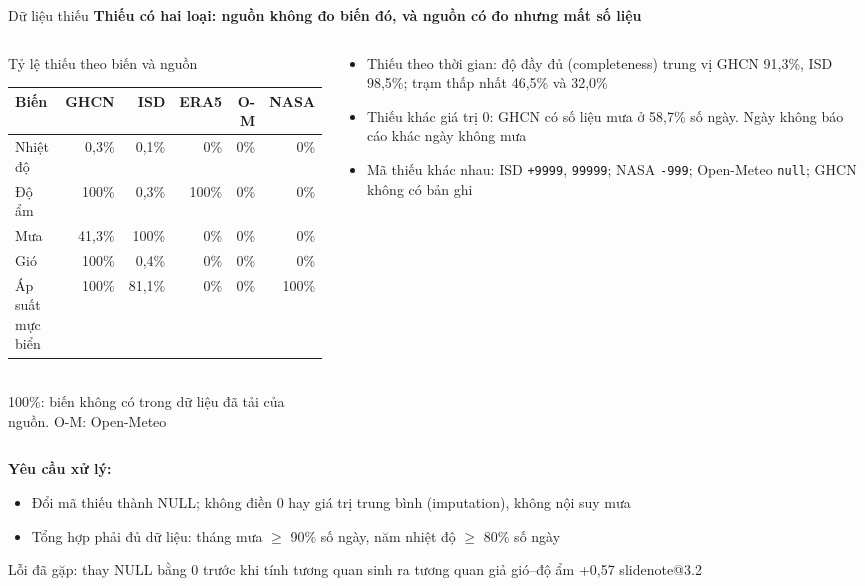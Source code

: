\documentclass[t,aspectratio=169,12pt]{beamer}
\makeatletter
\newcommand{\slidenote}[1]{\ifcsname slidenote@#1\endcsname\note{\csname slidenote@#1\endcsname}\fi}
\newcommand{\ketluan}[1]{\vskip2mm{\color{hustred}#1}}
\newcommand{\ychinh}[1]{\vskip1mm{\bfseries #1}\par\vskip1mm}
\makeatother
\begin{document}
\begin{frame}{Dữ liệu thiếu}
  \ychinh{Thiếu có hai loại: nguồn không đo biến đó, và nguồn có đo nhưng mất số liệu}
  \begin{columns}[T]
    \begin{column}{0.5\textwidth}
      \centering\scriptsize
      Tỷ lệ thiếu theo biến và nguồn\\[1mm]
      \begin{tabular}{@{}lrrrrr@{}}
        \toprule
        Biến & GHCN & ISD & ERA5 & O-M & NASA \\
        \midrule
        Nhiệt độ & 0,3\% & 0,1\% & 0\% & 0\% & 0\% \\
        Độ ẩm & \textcolor{badred}{100\%} & 0,3\% & \textcolor{badred}{100\%} & 0\% & 0\% \\
        Mưa & 41,3\% & \textcolor{badred}{100\%} & 0\% & 0\% & 0\% \\
        Gió & \textcolor{badred}{100\%} & 0,4\% & 0\% & 0\% & 0\% \\
        Áp suất mực biển & \textcolor{badred}{100\%} & 81,1\% & 0\% & 0\% & \textcolor{badred}{100\%} \\
        \bottomrule
      \end{tabular}\\[1mm]
      {\tiny\color{mutedgray}\textcolor{badred}{100\%}: biến không có trong dữ liệu đã tải của nguồn. O-M: Open-Meteo}
    \end{column}
    \begin{column}{0.48\textwidth}
      \begin{itemize}\scriptsize\setlength\itemsep{1mm}
        \item Thiếu theo thời gian: độ đầy đủ (completeness) trung vị GHCN 91,3\%, ISD 98,5\%; trạm thấp nhất 46,5\% và 32,0\%
        \item Thiếu khác giá trị 0: GHCN có số liệu mưa ở 58,7\% số ngày. Ngày không báo cáo khác ngày không mưa
        \item Mã thiếu khác nhau: ISD \texttt{+9999}, \texttt{99999}; NASA \texttt{-999}; Open-Meteo \texttt{null}; GHCN không có bản ghi
      \end{itemize}
    \end{column}
  \end{columns}
  \vskip1mm
  {\scriptsize\bfseries Yêu cầu xử lý:}
  \begin{itemize}\scriptsize\setlength\itemsep{0mm}
    \item Đổi mã thiếu thành NULL; không điền 0 hay giá trị trung bình (imputation), không nội suy mưa
    \item Tổng hợp phải đủ dữ liệu: tháng mưa $\geq$ 90\% số ngày, năm nhiệt độ $\geq$ 80\% số ngày
  \end{itemize}
  \ketluan{\scriptsize Lỗi đã gặp: thay NULL bằng 0 trước khi tính tương quan sinh ra tương quan giả gió--độ ẩm +0,57}
  \slidenote{3.2}
\end{frame}
\end{document}
